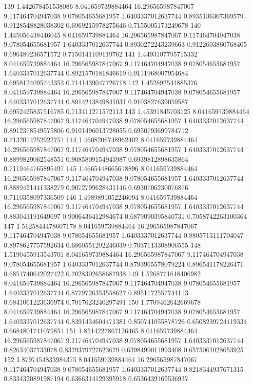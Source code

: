 {139 1.442678451538086 8.041659739884464 16.296565987847067 9.117464704947038 9.078054655681957 1.6403337012637744 0.8935136307369579 0.9128548828038302 0.6969215978275646 0.7155005173249678
140 1.445056438446045 8.041659739884464 16.296565987847067 9.117464704947038 9.078054655681957 1.6403337012637744 0.8930272243239663 0.9122603860768405 0.696489236571572 0.7150141109119762
141 1.4493107795715332 8.041659739884464 16.296565987847067 9.117464704947038 9.078054655681957 1.6403337012637744 0.8921570181846619 0.9111968007954684 0.6958124095743353 0.7141439047726718
142 1.452892541885376 8.041659739884464 16.296565987847067 9.117464704947038 9.078054655681957 1.6403337012637744 0.8914243849841031 0.9103827639059587 0.6952425837516785 0.713411271572113
143 1.45391845703125 8.041659739884464 16.296565987847067 9.117464704947038 9.078054655681957 1.6403337012637744 0.8912378549575806 0.9101496013728055 0.6950793699784712 0.7132014252922751
144 1.4608206748962402 8.041659739884464 16.296565987847067 9.117464704947038 9.078054655681957 1.6403337012637744 0.8899829062548551 0.9085809154943987 0.6939812898635864 0.7119464765895497
145 1.4665448665618896 8.041659739884464 16.296565987847067 9.117464704947038 9.078054655681957 1.6403337012637744 0.8889421441338279 0.9072799628431146 0.6930706230076876 0.7110358097336509
146 1.4989891052246094 8.041659739884464 16.296565987847067 9.117464704947038 9.078054655681957 1.6403337012637744 0.883043191649697 0.9006436412984674 0.6879090395840731 0.7058742263100364
147 1.5125844478607178 8.041659739884464 16.296565987847067 9.117464704947038 9.078054655681957 1.6403337012637744 0.8805713111704047 0.8978627757592634 0.6860551292246039 0.7037113308906555
148 1.5190455913543701 8.041659739884464 16.296565987847067 9.117464704947038 9.078054655681957 1.6403337012637744 0.8793965578079224 0.896541178226471 0.6851740642027422 0.7028302658687938
149 1.5268771648406982 8.041659739884464 16.296565987847067 9.117464704947038 9.078054655681957 1.6403337012637744 0.8779726353558627 0.8951172557744113 0.6841061223636974 0.7017623240297491
150 1.7709462642669678 8.041659739884464 16.296565987847067 9.117464704947038 9.078054655681957 1.6403337012637744 0.8391434604471381 0.850741055878726 0.6508239724419334 0.6684801741079851
151 1.8514227867126465 8.041659739884464 16.296565987847067 9.117464704947038 9.078054655681957 1.6403337012637744 0.82634037733078 0.8379379727623679 0.6398499011993408 0.6575061028653925
152 1.8797454833984375 8.041659739884464 16.296565987847067 9.117464704947038 9.078054655681957 1.6403337012637744 0.8218344937671315 0.8334320891987194 0.6366314129395918 0.6536439169536937
}

